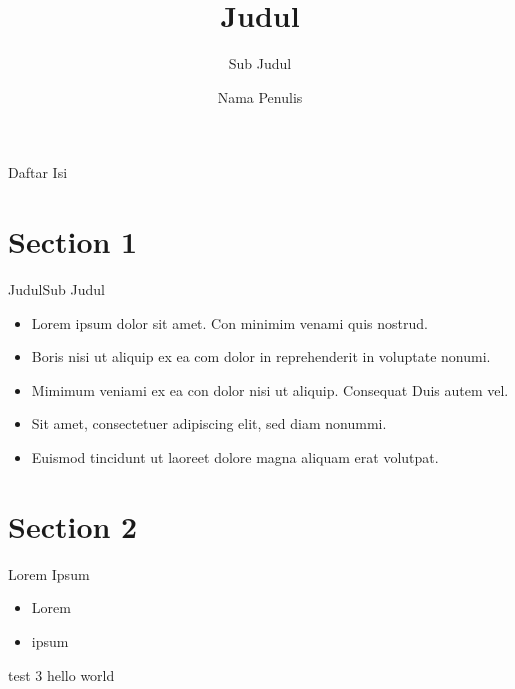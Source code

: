 \documentclass[aspectratio=169]{beamer}
\title{Judul}
\subtitle{Sub Judul}
\author{Nama Penulis}
\begin{document}
\begin{frame}[plain]
  \titlepage
\end{frame}

\begin{frame}{Daftar Isi}
  \tableofcontents
\end{frame}

\section{Section 1}

\begin{frame}{Judul}{Sub Judul}
  \begin{itemize}
    \item Lorem ipsum dolor sit amet. Con minimim venami quis nostrud.
    \item Boris nisi ut aliquip ex ea com dolor in reprehenderit in voluptate nonumi.
    \item Mimimum veniami ex ea con dolor nisi ut aliquip. Consequat Duis autem vel.
    \item Sit amet, consectetuer adipiscing elit, sed diam nonummi.
    \item Euismod tincidunt ut laoreet dolore magna aliquam erat volutpat.
  \end{itemize}
\end{frame}

\section{Section 2}
\begin{frame}{Lorem Ipsum}{}
  \begin{itemize}
    \item Lorem
    \item ipsum
  \end{itemize}
\end{frame}

\begin{frame}{test 3}{}
  hello world
\end{frame}
\end{document}
